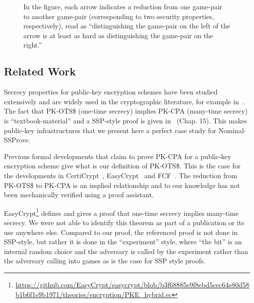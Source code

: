 \documentclass[a4paper,USenglish,cleveref, autoref]{lipics-v2021}
\renewcommand{\P}{\mathcal{P}}
\newcommand{\NSSP}{Nominal-SSProve\xspace}
\begin{document}
   
\begin{figure}
\begin{center}
\end{center}
\caption{In the figure, each arrow indicates a reduction from one game-pair to another game-pair (corresponding to two security properties, respectively), read as ``distinguishing the game-pair on the left of the arrow is at least as hard as distinguishing the game-pair on the right.''}
\label{fig:plan}
\end{figure}


\subsection{Related Work}\label{sec:related}

Secrecy properties for public-key encryption schemes have been studied extensively and are widely used in the cryptographic literature, for example in~\cite{mihir98}.
The fact that PK-OTS\$ (one-time secrecy) implies PK-CPA (many-time secrecy) is ``textbook-material'' and a SSP-style proof is given in~\cite{joy} (Chap. 15). This makes public-key infrastructures that we present here a perfect case study for \NSSP.

Previous formal developments that claim to prove PK-CPA for a public-key encryption scheme give what is our definition of PK-OTS\$.  This is the case for the developments in CertiCrypt~\cite{gilles09},  EasyCrypt~\cite{barthe11,husling22} and  FCF~\cite{petcher15fcf}. The reduction from PK-OTS\$ to PK-CPA is an implied relationship and to our knowledge has not been mechanically verified using a proof assistant.

EasyCrypt\footnote{\url{https://github.com/EasyCrypt/easycrypt/blob/b3f68885e9f8ebd5cec64e80d58b1b6f1e9b1971/theories/encryption/PKE_hybrid.ec}} defines and gives
a proof that one-time secrecy implies many-time secrecy. We were not able
to identify this theorem as part of a publication or its use anywhere else.
Compared to our proof, the referenced proof is not done in SSP-style,
but rather it is done in the ``experiment'' style, where ``the bit'' is an internal
random choice and the adversary is called by the experiment rather than the
adversary calling into games as is the case for SSP style proofs.
\end{document}

